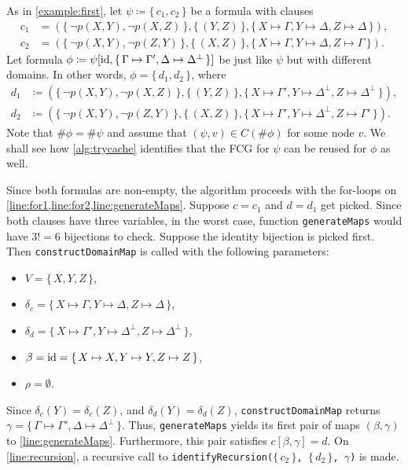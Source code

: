 \begin{example}\label{example}

  As in \cref{example:first}, let $\psi \coloneqq \{\, c_1, c_2 \,\}$ be a
  formula with clauses
  \begin{align*}
    c_1 &= (\{\, \neg p(X, Y), \neg p(X, Z) \,\}, \{\, (Y, Z) \,\}, \{\, X \mapsto \Gamma, Y \mapsto \Delta, Z \mapsto \Delta \,\}), \\
    c_2 &= (\{\, \neg p(X, Y), \neg p(Z, Y) \,\}, \{\, (X, Z) \,\}, \{\, X \mapsto \Gamma, Y \mapsto \Delta, Z \mapsto \Gamma \,\}).
  \end{align*}
  Let formula
  $\phi \coloneqq \psi[\operatorname{id}, \{\, \Gamma \mapsto \Gamma', \Delta \mapsto \Delta^\bot \,\}]$
  be just like $\psi$ but with different domains. In other words,
  $\phi = \{\, d_1, d_2 \,\}$, where
  \begin{align*}
    d_1 &\coloneqq (\{\, \neg p(X, Y), \neg p(X, Z) \,\}, \{\, (Y, Z) \,\}, \{\, X \mapsto \Gamma', Y \mapsto \Delta^\bot, Z \mapsto \Delta^\bot \,\}),\\
    d_2 &\coloneqq (\{\, \neg p(X, Y), \neg p(Z, Y) \,\}, \{\, (X, Z) \,\}, \{\, X \mapsto \Gamma', Y \mapsto \Delta^\bot, Z \mapsto \Gamma' \,\}).
  \end{align*}
  Note that $\#\phi = \#\psi$ and assume that $(\psi, v) \in C(\#\phi)$ for some
  node $v$. We shall see how \cref{alg:trycache} identifies that the FCG for
  $\psi$ can be reused for $\phi$ as well.

  Since both formulas are non-empty, the algorithm proceeds with the for-loops
  on \cref{line:for1,line:for2,line:generateMaps}. Suppose $c = c_1$ and
  $d = d_1$ get picked. Since both clauses have three variables, in the worst
  case, function \texttt{generateMaps} would have $3!=6$ bijections to check.
  Suppose the identity bijection is picked first. Then
  \texttt{constructDomainMap} is called with the following parameters:
  \begin{itemize}
    \item $V = \{\, X, Y, Z \,\}$,
    \item
          $\delta_c = \{\, X \mapsto \Gamma, Y \mapsto \Delta, Z \mapsto \Delta \,\}$,
    \item
          $\delta_d = \{\, X \mapsto \Gamma', Y \mapsto \Delta^\bot, Z \mapsto \Delta^\bot \,\}$,
    \item $\beta = \operatorname{id} = \{\, X \mapsto X, Y \mapsto Y, Z \mapsto Z \,\}$,
    \item $\rho = \emptyset$.
  \end{itemize}
  Since $\delta_c(Y) = \delta_c(Z)$, and $\delta_d(Y) = \delta_d(Z)$,
  \texttt{constructDomainMap} returns
  $\gamma = \{\, \Gamma \mapsto \Gamma', \Delta \mapsto \Delta^\bot \,\}$. Thus,
  \texttt{generateMaps} yields its first pair of maps $(\beta, \gamma)$ to
  \cref{line:generateMaps}. Furthermore, this pair satisfies
  $c[\beta, \gamma] = d$. On \cref{line:recursion}, a recursive call to
  \texttt{identifyRecursion($\{\,c_2\,\}$, $\{\,d_2\,\}$, $\gamma$)} is made.


\end{example}
